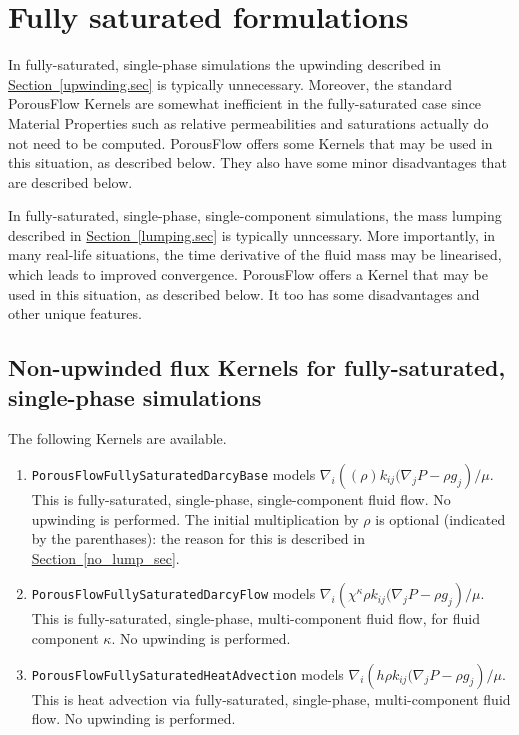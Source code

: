 \documentclass[12pt]{report}
\def\species{\kappa}
\def\massfrac{\chi}
\begin{document}
\section{Fully saturated formulations}

In fully-saturated, single-phase simulations the upwinding described
in \hyperref[upwinding.sec]{Section~\ref*{upwinding.sec}} is typically
unnecessary.  Moreover, the standard PorousFlow Kernels are somewhat
inefficient in the fully-saturated case since Material Properties such
as relative permeabilities and saturations actually do not need to be
computed.  PorousFlow offers some Kernels that may be used in this
situation, as described below.  They also have some minor
disadvantages that are described below.

In fully-saturated, single-phase, single-component simulations, the
mass lumping described in
\hyperref[lumping.sec]{Section~\ref*{lumping.sec}} is typically
unncessary.  More importantly, in many real-life situations, the time
derivative of the fluid mass may be linearised, which leads to
improved convergence.  PorousFlow offers a Kernel that may be used in
this situation, as described below.  It too has some disadvantages and
other unique features.

\subsection{Non-upwinded flux Kernels for fully-saturated,
  single-phase simulations}
\label{nonupwinded.flux.sec}

The following Kernels are available.
\begin{enumerate}
\item {\tt PorousFlowFullySaturatedDarcyBase} models $\nabla_{i}
  \left( (\rho) k_{ij} (\nabla_{j} P - \rho g_{j}\right) / \mu$.  This
  is fully-saturated, single-phase, single-component fluid flow.  No
  upwinding is performed.  The initial multiplication by $\rho$ is
  optional (indicated by the parenthases): the reason for this is
  described in \hyperref[no_lump_sec]{Section~\ref*{no_lump_sec}}.
\item {\tt PorousFlowFullySaturatedDarcyFlow} models $\nabla_{i}
  \left( \massfrac^{\species} \rho k_{ij} (\nabla_{j} P - \rho g_{j}\right) / \mu$.  This is
  fully-saturated, single-phase, multi-component fluid flow, for fluid
  component $\species$.  No
  upwinding is performed.
\item {\tt PorousFlowFullySaturatedHeatAdvection} models $\nabla_{i}
  \left( h \rho k_{ij} (\nabla_{j} P - \rho g_{j}\right) / \mu$.  This is
  heat advection via fully-saturated, single-phase, multi-component fluid flow.  No
  upwinding is performed.
\end{enumerate}
\end{document}
